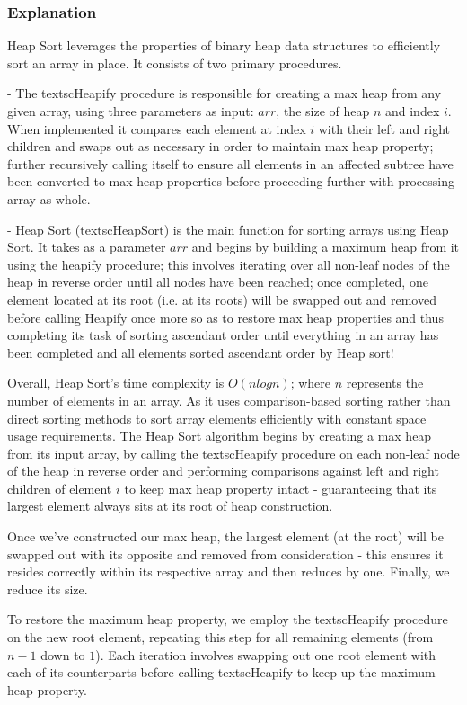 \documentclass{article}
\begin{document}
\subsubsection{Explanation}


Heap Sort leverages the properties of binary heap data structures to efficiently sort an array in place. It consists of two primary procedures.

- The textscHeapify procedure is responsible for creating a max heap from any given array, using three parameters as input: $arr$, the size of heap $n$ and index $i$. When implemented it compares each element at index $i$ with their left and right children and swaps out as necessary in order to maintain max heap property; further recursively calling itself to ensure all elements in an affected subtree have been converted to max heap properties before proceeding further with processing array as whole.

- Heap Sort (textscHeapSort) is the main function for sorting arrays using Heap Sort. It takes as a parameter $arr$ and begins by building a maximum heap from it using the heapify procedure; this involves iterating over all non-leaf nodes of the heap in reverse order until all nodes have been reached; once completed, one element located at its root (i.e. at its roots) will be swapped out and removed before calling Heapify once more so as to restore max heap properties and thus completing its task of sorting ascendant order until everything in an array has been completed and all elements sorted ascendant order by Heap sort!

Overall, Heap Sort's time complexity is $O(n log n)$; where $n$ represents the number of elements in an array. As it uses comparison-based sorting rather than direct sorting methods to sort array elements efficiently with constant space usage requirements.
The Heap Sort algorithm begins by creating a max heap from its input array, by calling the textscHeapify procedure on each non-leaf node of the heap in reverse order and performing comparisons against left and right children of element $i$ to keep max heap property intact - guaranteeing that its largest element always sits at its root of heap construction.

Once we've constructed our max heap, the largest element (at the root) will be swapped out with its opposite and removed from consideration - this ensures it resides correctly within its respective array and then reduces by one. Finally, we reduce its size.

To restore the maximum heap property, we employ the textscHeapify procedure on the new root element, repeating this step for all remaining elements (from $n-1$ down to $1$). Each iteration involves swapping out one root element with each of its counterparts before calling textscHeapify to keep up the maximum heap property.
\end{document}
